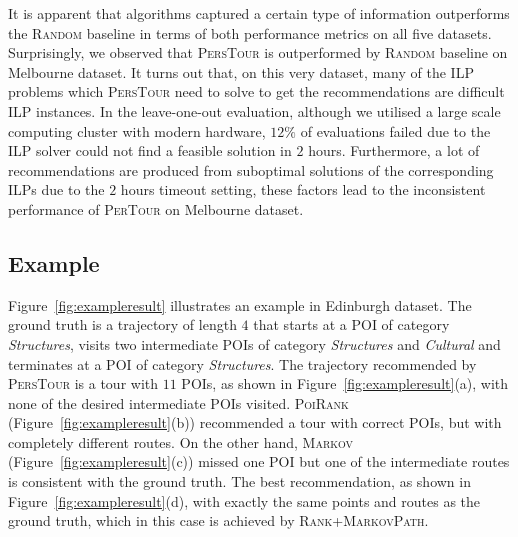 It is apparent that algorithms captured a certain type of information %
outperforms the \textsc{Random} baseline in terms of both performance metrics on all five datasets.
Surprisingly, we observed that \textsc{PersTour} is outperformed by \textsc{Random} baseline on Melbourne dataset. %
It turns out that, on this very dataset, many of the ILP problems
which \textsc{PersTour} need to solve to get the recommendations are difficult ILP instances.
In the leave-one-out evaluation, although we utilised a large scale computing cluster with modern hardware,
$12\%$ of evaluations failed due to the ILP solver could not find a feasible solution in $2$ hours.
Furthermore, a lot of recommendations are produced from suboptimal solutions of the corresponding ILPs due to
the $2$ hours timeout setting, these factors lead to the inconsistent performance of \textsc{PerTour} on Melbourne dataset.



\subsection{Example}
\label{sec:example}
\secmoveup



Figure~\ref{fig:exampleresult} illustrates an example %
in Edinburgh dataset.
The ground truth is a trajectory of length $4$ that starts at a POI of category \textit{Structures},
visits two intermediate POIs of category \textit{Structures} and \textit{Cultural} and
terminates at a POI of category \textit{Structures}.
The trajectory recommended by \textsc{PersTour} is a tour with $11$ POIs, as shown in Figure~\ref{fig:exampleresult}(a),
with none of the desired intermediate POIs visited.
\textsc{PoiRank} (Figure~\ref{fig:exampleresult}(b)) recommended a tour with correct POIs,
but with completely different routes.
On the other hand, \textsc{Markov} (Figure~\ref{fig:exampleresult}(c)) missed one POI 
but one of the intermediate routes is consistent with the ground truth.
The best recommendation, as shown in Figure~\ref{fig:exampleresult}(d), 
with exactly the same points and routes as the ground truth,
which in this case is achieved by \textsc{Rank+MarkovPath}.




